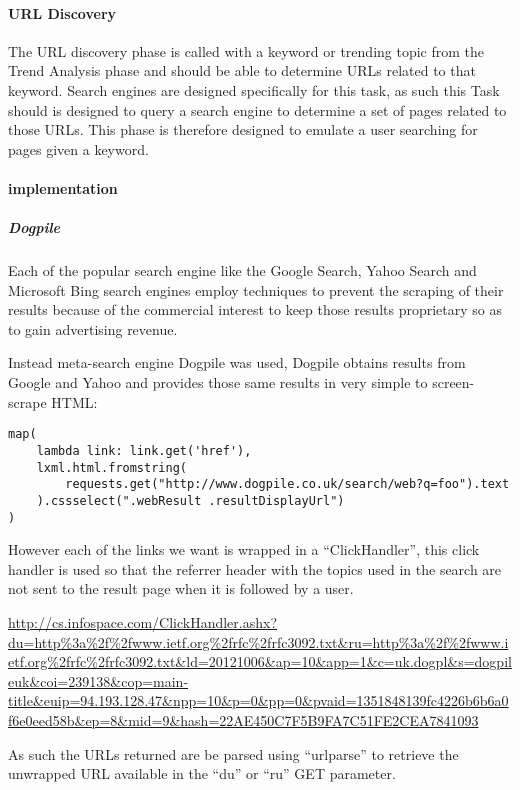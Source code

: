 \paragraph{URL Discovery}
The URL discovery phase is called with a keyword or trending topic from the Trend Analysis phase and should be able to determine URLs related to that keyword.  Search engines are designed specifically for this task, as such this Task should is designed to query a search engine to determine a set of pages related to those URLs. This phase is therefore designed to emulate a user searching for pages given a keyword.

\paragraph{implementation}
\subparagraph{Dogpile}
Each of the popular search engine like the Google Search, Yahoo Search and Microsoft Bing search engines employ techniques to prevent the scraping of their results because of the commercial interest to keep those results proprietary so as to gain advertising revenue.

Instead meta-search engine Dogpile was used, Dogpile obtains results from Google and Yahoo and provides those same results in very simple to screen-scrape HTML\cite{screen-scrape}:

\begin{verbatim}
map(
    lambda link: link.get('href'),
    lxml.html.fromstring(
        requests.get("http://www.dogpile.co.uk/search/web?q=foo").text
    ).cssselect(".webResult .resultDisplayUrl")
)
\end{verbatim}

However each of the links we want is wrapped in a ``ClickHandler'', this click handler is used so that the referrer header with the topics used in the search are not sent to the result page when it is followed by a user.

\url{http://cs.infospace.com/ClickHandler.ashx?du=http%3a%2f%2fwww.ietf.org%2frfc%2frfc3092.txt&ru=http%3a%2f%2fwww.ietf.org%2frfc%2frfc3092.txt&ld=20121006&ap=10&app=1&c=uk.dogpl&s=dogpileuk&coi=239138&cop=main-title&euip=94.193.128.47&npp=10&p=0&pp=0&pvaid=1351848139fc4226b6b6a0f6e0eed58b&ep=8&mid=9&hash=22AE450C7F5B9FA7C51FE2CEA7841093}

As such the URLs returned are be parsed using ``urlparse'' to retrieve the unwrapped URL available in the ``du'' or ``ru'' GET parameter\cite{rfc3092}.